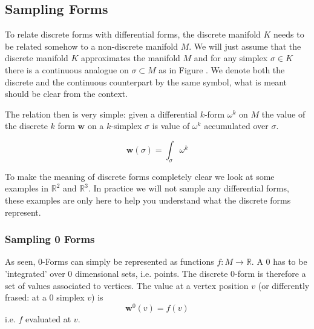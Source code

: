 \subsection{Sampling Forms}

To relate discrete forms with differential forms, the discrete manifold $K$ needs to be related somehow to a non-discrete manifold $M$. We will just assume that the discrete manifold $K$ approximates the manifold $M$ and for any simplex $\sigma \in K$ there is a continuous analogue on $\sigma \subset M$ as in Figure . We denote both the discrete and the continuous counterpart by the same symbol, what is meant should be clear from the context.

The relation then is very simple: given a differential $k$-form $\omega^k$ on $M$ the value of the discrete $k$ form $\textbf{w}$ on a $k$-simplex $\sigma$ is value of $\omega^k$ accumulated over $\sigma$.

 \[\textbf{w}(\sigma) = \int_\sigma \omega^k\]

To make the meaning of discrete forms completely clear we look at some examples in $\mathbb R^2$ and $\mathbb R^3$. In practice we will not sample any differential forms, these examples are only here to help you understand what the discrete forms represent.

\subsubsection{Sampling 0 Forms}

As seen, $0$-Forms can simply be represented as functions $f: M\to \mathbb R$. A $0$ has to be 'integrated' over 0 dimensional sets, i.e. points. The discrete 0-form is therefore a set of values associated to vertices. The value at a vertex position $v$ (or differently frased: at a 0 simplex $v$) is
\[\textbf{w}^0(v) = f(v)\]
i.e. $f$ evaluated at $v$.

